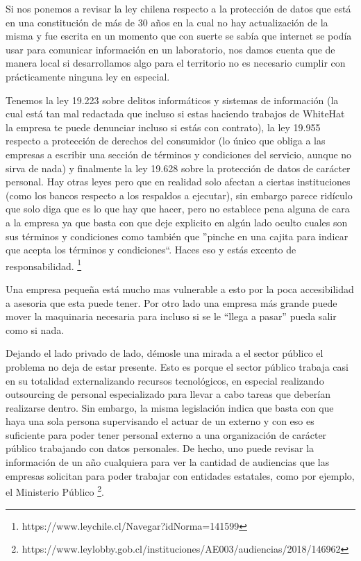 \documentclass[11pt]{utalcaDoc}
\begin{document}
Si nos ponemos a revisar la ley chilena respecto a la protección de datos que está en una constitución de más de 30 años en la cual no hay actualización de la misma y fue escrita en un momento que con suerte se sabía que internet se podía usar para comunicar información en un laboratorio, nos damos cuenta que de manera local si desarrollamos algo para el territorio no es necesario cumplir con prácticamente ninguna ley en especial. 

Tenemos la ley 19.223 sobre delitos informáticos y sistemas de información (la cual está tan mal redactada que incluso si estas haciendo trabajos de WhiteHat la empresa te puede denunciar incluso si estás con contrato), la ley 19.955 respecto a protección de derechos del consumidor (lo único que obliga a las empresas a escribir una sección de términos y condiciones del servicio, aunque no sirva de nada) y finalmente la ley 19.628 sobre la protección de datos de carácter personal. Hay otras leyes pero que en realidad solo afectan a ciertas instituciones (como los bancos respecto a los respaldos a ejecutar), sin embargo parece ridículo que solo diga que es lo que hay que hacer, pero no establece pena alguna de cara a la empresa ya que basta con que deje explicito en algún lado oculto cuales son sus términos y condiciones como también que ''pinche en una cajita para indicar que acepta los términos y condiciones``. Haces eso y estás excento de responsabilidad. \footnote{https://www.leychile.cl/Navegar?idNorma=141599}

Una empresa pequeña está mucho mas vulnerable a esto por la poca accesibilidad a asesoria que esta puede tener. Por otro lado una empresa más grande puede mover la maquinaria necesaria para incluso si se le ``llega a pasar'' pueda salir como si nada.

Dejando el lado privado de lado, démosle una mirada a el sector público el problema no deja de estar presente. Esto es porque el sector público trabaja casi en su totalidad externalizando recursos tecnológicos, en especial realizando outsourcing de personal especializado para llevar a cabo tareas que deberían realizarse dentro. Sin embargo, la misma legislación indica que basta con que haya una sola persona supervisando el actuar de un externo y con eso es suficiente para poder tener personal externo a una organización de carácter público trabajando con datos personales. De hecho, uno puede revisar la información de un año cualquiera para ver la cantidad de audiencias que las empresas solicitan para poder trabajar con entidades estatales, como por ejemplo, el Ministerio Público \footnote{https://www.leylobby.gob.cl/instituciones/AE003/audiencias/2018/146962}.
\end{document}

